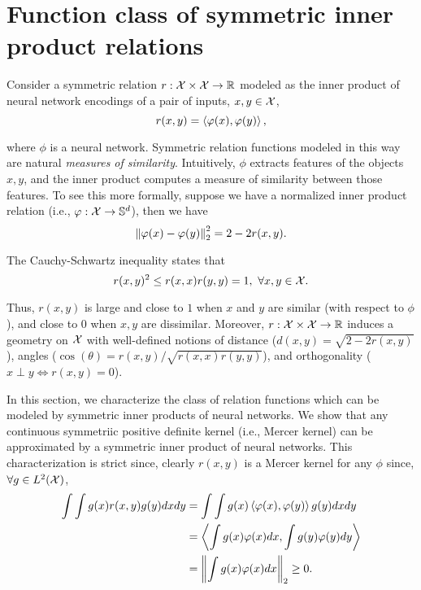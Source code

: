 \section{Function class of symmetric inner product relations}\label{sec:symmetric_relations}

Consider a symmetric relation $r: {\mathcal{X}} \times {\mathcal{X}} \to \mathbb{R}$ modeled as the inner product of neural network encodings of a pair of inputs, $x, y \in {\mathcal{X}}$,
\begin{equation}\label{eq:symmetric_iprod_relation}
    r(x, y) = \iprod{\phi(x)}{\phi(y)},
\end{equation}

\noindent where $\phi$ is a neural network. Symmetric relation functions modeled in this way are natural \textit{measures of similarity}. Intuitively, $\phi$ extracts features of the objects $x,y$, and the inner product computes a measure of similarity between those features. To see this more formally, suppose we have a normalized inner product relation (i.e., $\varphi: {\mathcal{X}} \to {\mathbb{S}}^{d}$), then we have
\begin{equation}
    \twonorm{\phi(x) - \phi(y)}^2 = 2 - 2 r(x, y).
\end{equation}

The Cauchy-Schwartz inequality states that
\begin{equation}
    r(x, y)^2 \leq r(x, x) r(y, y) = 1, \ \forall x, y \in \calX.
\end{equation}

Thus, $r(x,y)$ is large and close to $1$ when $x$ and $y$ are similar (with respect to $\phi$), and close to $0$ when $x, y$ are dissimilar. Moreover, $r: {\mathcal{X}} \times {\mathcal{X}} \to \mathbb{R}$ induces a geometry on ${\mathcal{X}}$ with well-defined notions of distance ($d(x,y) = \sqrt{2 - 2 r(x,y)}$), angles ($\cos(\theta) = r(x,y)/\sqrt{r(x,x) r(y,y)}$), and orthogonality ($x \perp y \iff r(x,y) = 0$).

In this section, we characterize the class of relation functions which can be modeled by symmetric inner products of neural networks. We show that any continuous symmetriic positive definite kernel (i.e., Mercer kernel) can be approximated by a symmetric inner product of neural networks. This characterization is strict since, clearly $r(x,y)$ is a Mercer kernel for any $\phi$ since, $\forall g \in L^2({\mathcal{X}})$,
\begin{equation*}
    \begin{split}
        \int \int g(x) r(x,y) g(y) dx dy &= \int \int g(x) \iprod{\phi(x)}{\phi(y)} g(y) dx dy \\
        &= \iprod{\int g(x) \phi(x) dx}{\int g(y) \phi(y) dy} \\
        &= \twonorm{\int g(x) \phi(x) dx} \geq 0.
    \end{split}
\end{equation*}

